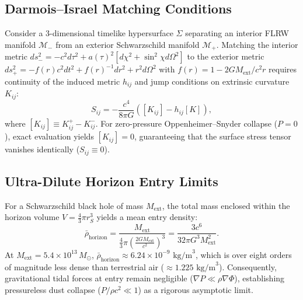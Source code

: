 \documentclass[11pt,a4paper]{article}
\begin{document}
\subsection{Darmois--Israel Matching Conditions}\label{sec:darmois}
Consider a 3-dimensional timelike hypersurface $\Sigma$ separating an interior FLRW manifold $\mathcal{M}_-$ from an exterior Schwarzschild manifold $\mathcal{M}_+$. Matching the interior metric $ds_-^2 = -c^2 d\tau^2 + a(\tau)^2 [d\chi^2 + \sin^2\chi d\Omega^2]$ to the exterior metric $ds_+^2 = -f(r) c^2 dt^2 + f(r)^{-1} dr^2 + r^2 d\Omega^2$ with $f(r) = 1 - 2GM_{\text{ext}}/c^2 r$ requires continuity of the induced metric $h_{ij}$ and jump conditions on extrinsic curvature $K_{ij}$:
\begin{equation}\label{eq:junction_stress}
    S_{ij} = -\frac{c^4}{8\pi G} \left( [K_{ij}] - h_{ij} [K] \right),
\end{equation}
where $[K_{ij}] \equiv K_{ij}^+ - K_{ij}^-$. For zero-pressure Oppenheimer--Snyder collapse ($P=0$), exact evaluation yields $[K_{ij}] = 0$, guaranteeing that the surface stress tensor vanishes identically ($S_{ij} \equiv 0$).

\subsection{Ultra-Dilute Horizon Entry Limits}\label{sec:dilute}
For a Schwarzschild black hole of mass $M_{\text{ext}}$, the total mass enclosed within the horizon volume $V = \frac{4}{3}\pi r_S^3$ yields a mean entry density:
\begin{equation}\label{eq:horizon_density}
    \bar{\rho}_{\text{horizon}} = \frac{M_{\text{ext}}}{\frac{4}{3}\pi \left(\frac{2GM_{\text{ext}}}{c^2}\right)^3} = \frac{3 c^6}{32\pi G^3 M_{\text{ext}}^2}.
\end{equation}
At $M_{\text{ext}} = 5.4 \times 10^{13} \, M_\odot$, $\bar{\rho}_{\text{horizon}} \approx 6.24 \times 10^{-9} \text{ kg/m}^3$, which is over eight orders of magnitude less dense than terrestrial air ($\approx 1.225 \text{ kg/m}^3$). Consequently, gravitational tidal forces at entry remain negligible ($\nabla P \ll \rho \nabla \Phi$), establishing pressureless dust collapse ($P/\rho c^2 \ll 1$) as a rigorous asymptotic limit.
\end{document}
